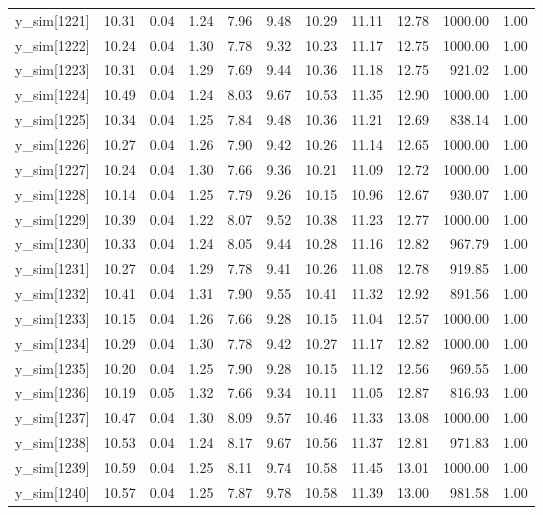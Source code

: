 \begin{table}[ht]
\begin{tabular}{rrrrrrrrrrr}
  y\_sim[1221] & 10.31 & 0.04 & 1.24 & 7.96 & 9.48 & 10.29 & 11.11 & 12.78 & 1000.00 & 1.00 \\ 
  y\_sim[1222] & 10.24 & 0.04 & 1.30 & 7.78 & 9.32 & 10.23 & 11.17 & 12.75 & 1000.00 & 1.00 \\ 
  y\_sim[1223] & 10.31 & 0.04 & 1.29 & 7.69 & 9.44 & 10.36 & 11.18 & 12.75 & 921.02 & 1.00 \\ 
  y\_sim[1224] & 10.49 & 0.04 & 1.24 & 8.03 & 9.67 & 10.53 & 11.35 & 12.90 & 1000.00 & 1.00 \\ 
  y\_sim[1225] & 10.34 & 0.04 & 1.25 & 7.84 & 9.48 & 10.36 & 11.21 & 12.69 & 838.14 & 1.00 \\ 
  y\_sim[1226] & 10.27 & 0.04 & 1.26 & 7.90 & 9.42 & 10.26 & 11.14 & 12.65 & 1000.00 & 1.00 \\ 
  y\_sim[1227] & 10.24 & 0.04 & 1.30 & 7.66 & 9.36 & 10.21 & 11.09 & 12.72 & 1000.00 & 1.00 \\ 
  y\_sim[1228] & 10.14 & 0.04 & 1.25 & 7.79 & 9.26 & 10.15 & 10.96 & 12.67 & 930.07 & 1.00 \\ 
  y\_sim[1229] & 10.39 & 0.04 & 1.22 & 8.07 & 9.52 & 10.38 & 11.23 & 12.77 & 1000.00 & 1.00 \\ 
  y\_sim[1230] & 10.33 & 0.04 & 1.24 & 8.05 & 9.44 & 10.28 & 11.16 & 12.82 & 967.79 & 1.00 \\ 
  y\_sim[1231] & 10.27 & 0.04 & 1.29 & 7.78 & 9.41 & 10.26 & 11.08 & 12.78 & 919.85 & 1.00 \\ 
  y\_sim[1232] & 10.41 & 0.04 & 1.31 & 7.90 & 9.55 & 10.41 & 11.32 & 12.92 & 891.56 & 1.00 \\ 
  y\_sim[1233] & 10.15 & 0.04 & 1.26 & 7.66 & 9.28 & 10.15 & 11.04 & 12.57 & 1000.00 & 1.00 \\ 
  y\_sim[1234] & 10.29 & 0.04 & 1.30 & 7.78 & 9.42 & 10.27 & 11.17 & 12.82 & 1000.00 & 1.00 \\ 
  y\_sim[1235] & 10.20 & 0.04 & 1.25 & 7.90 & 9.28 & 10.15 & 11.12 & 12.56 & 969.55 & 1.00 \\ 
  y\_sim[1236] & 10.19 & 0.05 & 1.32 & 7.66 & 9.34 & 10.11 & 11.05 & 12.87 & 816.93 & 1.00 \\ 
  y\_sim[1237] & 10.47 & 0.04 & 1.30 & 8.09 & 9.57 & 10.46 & 11.33 & 13.08 & 1000.00 & 1.00 \\ 
  y\_sim[1238] & 10.53 & 0.04 & 1.24 & 8.17 & 9.67 & 10.56 & 11.37 & 12.81 & 971.83 & 1.00 \\ 
  y\_sim[1239] & 10.59 & 0.04 & 1.25 & 8.11 & 9.74 & 10.58 & 11.45 & 13.01 & 1000.00 & 1.00 \\ 
  y\_sim[1240] & 10.57 & 0.04 & 1.25 & 7.87 & 9.78 & 10.58 & 11.39 & 13.00 & 981.58 & 1.00 \\ 

\end{tabular}
\end{table}
